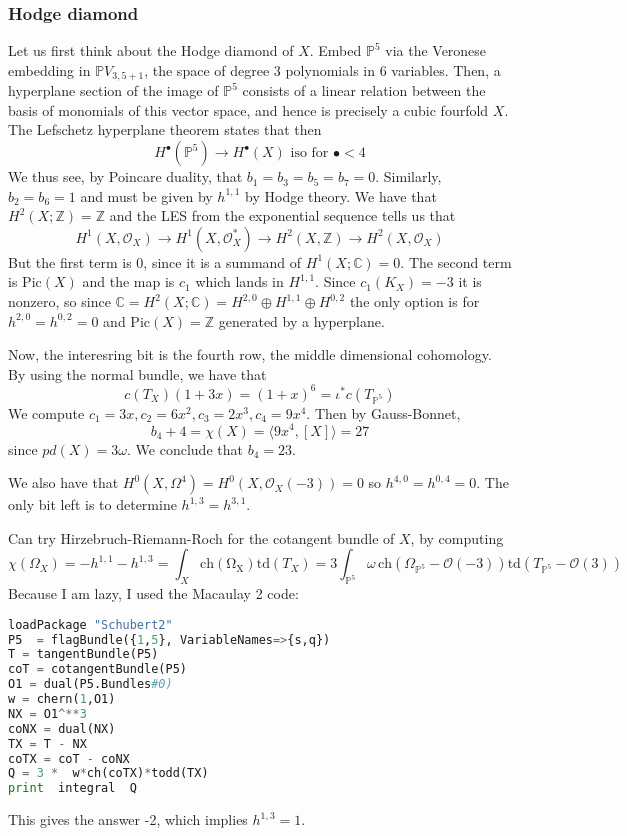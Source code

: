 \subsubsection{Hodge diamond}

Let us first think about the Hodge diamond of $X$. Embed $\mathbb{P}^5$ via the Veronese embedding in $\mathbb{P}V_{3,5+1}$, the space of degree 3 polynomials in 6 variables. Then, a hyperplane section of the image of $\mathbb{P}^5$ consists of a linear relation between the basis of monomials of this vector space, and hence is precisely a cubic fourfold $X$. The Lefschetz hyperplane theorem states that then $$H^\bullet(\mathbb{P}^5)\xrightarrow{}H^\bullet (X) \text{ iso for }\bullet<4$$
We thus see, by Poincare duality, that $b_{1}=b_{3}=b_{5}=b_{7}=0$. Similarly, $b_{2}=b_{6}=1$ and must be given by $h^{1,1}$ by Hodge theory. We have that $H^2(X;\mathbb{Z})=\mathbb{Z}$ and the LES from the exponential sequence tells us that $$H^1(X,\mathcal{O}_{X})\xrightarrow{}H^1(X,\mathcal{O}_{X}^*)\xrightarrow{}H^2(X,\mathbb{Z})\xrightarrow{}H^2(X,\mathcal{O}_{X})$$
But the first term is 0, since it is a summand of $H^1(X;\mathbb{C})=0$. The second term is $\mathrm{Pic}(X)$ and the map is $c_1$ which lands in $H^{1,1}$. Since $c_1(K_X)=-3$ it is nonzero, so since $\mathbb{C}=H^2(X;\mathbb{C})=H^{2,0}\oplus H^{1,1}\oplus H^{0,2}$ the only option is for $h^{2,0}=h^{0,2}=0$ and $\mathrm{Pic}(X)=\mathbb{Z}$ generated by a hyperplane. 

Now, the interesring bit is the fourth row, the middle dimensional cohomology. By using the normal bundle, we have that $$c(T_{X})(1+3x)=(1+x)^6=\iota^* c(T_{\mathbb{P}^5})$$We compute $c_1=3x, c_2=6x^2, c_3=2x^3, c_4=9x^4$. Then by Gauss-Bonnet, $$b_{4}+4=\chi(X)=\langle 9x^4, [X] \rangle= 27 $$since $pd(X)=3\omega$. We conclude that $b_4=23$. 

We also have that $H^0(X, \Omega^4)=H^0(X, \mathcal{O}_{X}(-3))=0$ so $h^{4,0}=h^{0,4}=0$. The only bit left is to determine $h^{1,3}=h^{3,1}$. 

Can try Hirzebruch-Riemann-Roch for the cotangent bundle of $X$, by computing $$\chi(\Omega_{X})=-h^{1,1}-h^{1,3}=\int _{X}\mathrm{ch(\Omega_{X})}\mathrm{td}(T_{X})=3\int _{\mathbb{P}^5} \omega \,\mathrm{ch}(\Omega_{\mathbb{P}^5}-\mathcal{O}(-3)) \mathrm{td}(T_{\mathbb{P}^5}-\mathcal{O}(3))  $$
Because I am lazy, I used the Macaulay 2 code: 

\begin{lstlisting}[language=Python]
loadPackage "Schubert2"
P5  = flagBundle({1,5}, VariableNames=>{s,q})
T = tangentBundle(P5)
coT = cotangentBundle(P5)
O1 = dual(P5.Bundles#0)
w = chern(1,O1)
NX = O1^**3
coNX = dual(NX)
TX = T - NX
coTX = coT - coNX
Q = 3 *  w*ch(coTX)*todd(TX)
print  integral  Q
\end{lstlisting}
This gives the answer -2, which implies $h^{1,3}=1$.

